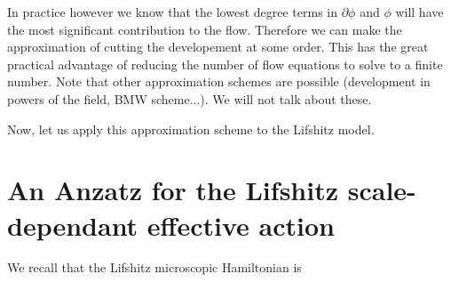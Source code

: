 In practice however we know that the lowest degree terms in $\partial \phi$ and $\phi$ will have the most significant contribution to the flow. Therefore we can make the approximation of cutting the developement at some order. This has the great practical advantage of reducing the number of flow equations to solve to a finite number. Note that other approximation schemes are possible (development in powers of the field, BMW scheme...). We will not talk about these.

Now, let us apply this approximation scheme to the Lifshitz model.

\section{An Anzatz for the Lifshitz scale-dependant effective action}
We recall that the Lifshitz microscopic Hamiltonian is

